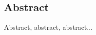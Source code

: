 \documentclass[a4paper,11pt,twoside]{report}
\begin{document}
\begin{center}
\section*{Abstract}
Abstract, abstract, abstract...







\end{center}
\end{document}
